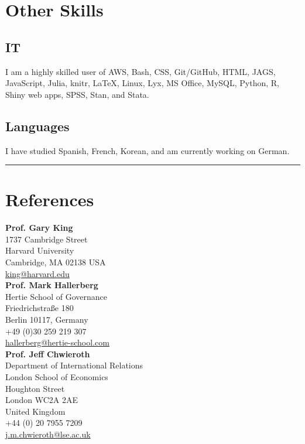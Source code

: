 \documentclass[a4paper]{article}
\begin{document}
\section*{Other Skills}

\subsection*{IT}

I am a highly skilled user of AWS, Bash, CSS, Git/GitHub, HTML, JAGS, JavaScript, Julia, knitr, LaTeX, Linux, Lyx, MS Office, MySQL, Python, R, Shiny web apps, SPSS, Stan, and Stata.

\subsection*{Languages}

I have studied Spanish, French, Korean, and am currently working on German.


\vspace{0.5cm}
\medskip\hrule height 1pt
\vspace{0.5cm}

\section*{References}

\noindent \textbf{Prof. Gary King} \\
1737 Cambridge Street \\
Harvard University \\
Cambridge, MA 02138
USA \\
\href{mailto:king@harvard.edu}{king@harvard.edu}\\

\noindent \textbf{Prof. Mark Hallerberg} \\
Hertie School of Governance\\
Friedrichstra{\ss}e 180\\
Berlin 10117, Germany \\
+49 (0)30 259 219 307 \\
\href{mailto:hallerberg@hertie-school.com}{hallerberg@hertie-school.com}\\

\noindent \textbf{Prof. Jeff Chwieroth}\\
Department of International Relations \\
London School of Economics \\
Houghton Street \\
London WC2A 2AE \\
United Kingdom\\
+44 (0) 20 7955 7209\\
\href{mailto:j.m.chwieroth@lse.ac.uk}{j.m.chwieroth@lse.ac.uk}\\
\end{document}
